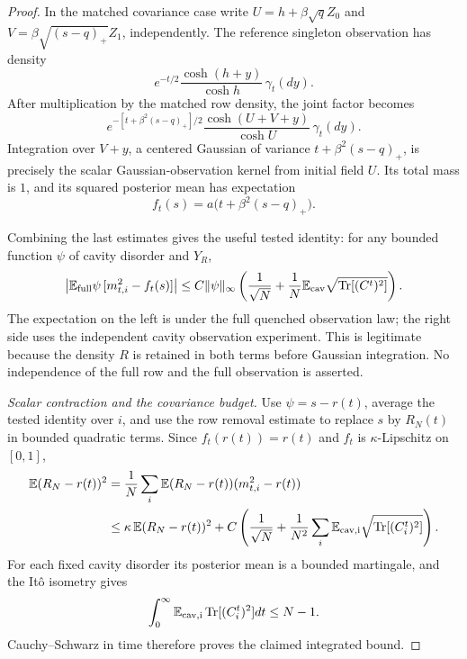\documentclass[11pt,reqno]{amsart}
\begin{document}
\begin{proof}
In the matched covariance case write
$U=h+\beta\sqrt q Z_0$ and
$V=\beta\sqrt{(s-q)_+}Z_1$, independently.
The reference singleton observation has density
\[
 e^{-t/2}\frac{\cosh(h+y)}{\cosh h}\,\gamma_t(dy).
\]
After multiplication by the matched row density, the joint factor becomes
\[
 e^{-[t+\beta^2(s-q)_+]/2}
 \frac{\cosh(U+V+y)}{\cosh U}\,\gamma_t(dy).
\]
Integration over $V+y$, a centered Gaussian of variance
$t+\beta^2(s-q)_+$, is precisely the scalar Gaussian-observation kernel
from initial field $U$. Its total mass is $1$, and its squared posterior
mean has expectation
\[
 f_t(s)=a\bigl(t+\beta^2(s-q)_+\bigr).
\]

Combining the last estimates gives the useful tested identity: for any
bounded function $\psi$ of cavity disorder and $Y_R$,
\[
 \left|\mathbb E_{\rm full}\psi\,[m_{t,i}^2-f_t(s)]\right|
 \le C\|\psi\|_\infty
 \left(\frac1{\sqrt N}+
       \frac1N\mathbb E_{\rm cav}\sqrt{\operatorname{Tr}[(C^t)^2]}\right).
\]
The expectation on the left is under the full quenched observation law;
the right side uses the independent cavity observation experiment.
This is legitimate because the density $R$ is retained in both terms
before Gaussian integration. No independence of the full row and the
full observation is asserted.

\medskip\noindent\emph{Scalar contraction and the covariance budget.}
Use $\psi=s-r(t)$, average the tested identity over $i$, and use the row
removal estimate to replace $s$ by $R_N(t)$ in bounded quadratic terms.
Since $f_t(r(t))=r(t)$ and $f_t$ is $\kappa$-Lipschitz on $[0,1]$,
\[
 \begin{split}
 \mathbb E(R_N-r(t))^2
 &=\frac1N\sum_i\mathbb E(R_N-r(t))(m_{t,i}^2-r(t))\\
 &\le\kappa\,\mathbb E(R_N-r(t))^2+
 C\left(\frac1{\sqrt N}+
 \frac1{N^2}\sum_i\mathbb E_{\rm cav,i}
                    \sqrt{\operatorname{Tr}[(C_i^t)^2]}\right).
 \end{split}
\]
For each fixed cavity disorder its posterior mean is a bounded martingale,
and the It\^o isometry gives
\[
 \int_0^\infty\mathbb E_{\rm cav,i}\operatorname{Tr}[(C_i^t)^2]dt
 \le N-1.
\]
Cauchy--Schwarz in time therefore proves the claimed integrated bound.


\end{proof}
\end{document}
